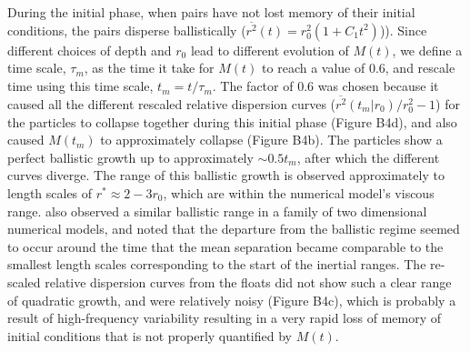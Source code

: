 \documentclass[]{ametsoc}
\begin{document}
During the initial phase, when pairs have not lost memory of their initial conditions, the pairs disperse ballistically ($\overline{r^2}(t) = r_0^2 (1 + C_1t^2)$)). Since different choices of depth and $r_0$ lead to different evolution of $M(t)$, we define a time scale, $\tau_m$, as the time it take for $M(t)$ to reach a value of 0.6, and rescale time using this time scale, $t_m = t/\tau_m$. The factor of 0.6 was chosen because it caused all the different rescaled relative dispersion curves ($\overline{r^2} (t_m | r_0) /r_0^2 -1$) for the particles to collapse together during this initial phase (Figure B4d), and also caused $M(t_m)$ to approximately collapse (Figure B4b). The particles show a perfect ballistic growth up to approximately $\sim 0.5t_m$, after which the different curves diverge. %
The range of this ballistic growth is observed approximately to length scales of $r^* \approx 2-3r_0$, which are within the numerical model's viscous range. \citet{foussard2017relative} also observed a similar ballistic range in a family of two dimensional numerical models, and noted that the departure from the ballistic regime seemed to occur around the time that the mean separation became comparable to the smallest length scales corresponding to the start of the inertial ranges. The re-scaled relative dispersion curves from the floats did not show such a clear range of quadratic growth, and were relatively noisy (Figure B4c), which is probably a result of high-frequency variability resulting in a very rapid loss of memory of initial conditions that is not properly quantified by $M(t)$.




\end{document}

